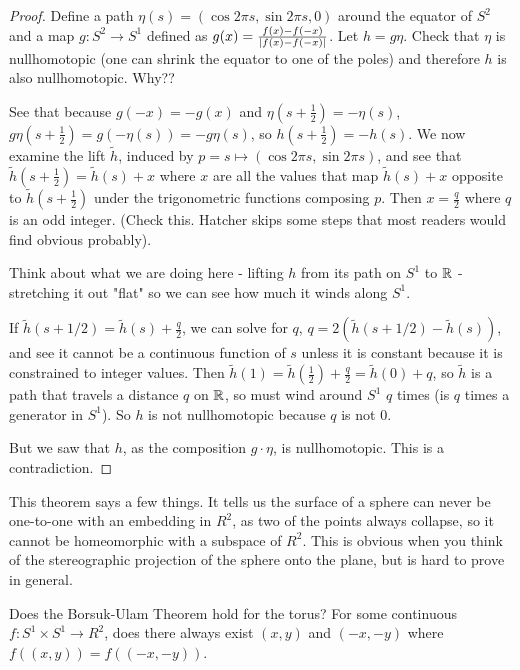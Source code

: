 \documentclass[10pt]{article}
\begin{document}
\begin{proof}

	Define a path $\eta(s) = (\cos 2\pi s, \sin 2\pi s, 0)$ around the equator of
	$S^2$ and a map $g: S^2 \to S^1$ defined as $g(x) = \frac{f(x) -
	f(-x)}{\lvert f(x) - f(-x)\rvert}$. Let $h = g\eta$. Check that $\eta$ is
	nullhomotopic (one can shrink the equator to one of the poles) and therefore
	$h$ is also nullhomotopic. Why??

	See that because $g(-x) = -g(x)$ and $\eta(s + \frac 1 2) = -\eta(s)$,
	$g\eta(s + \frac 1 2) = g(-\eta(s)) = -g\eta(s)$, so $h(s + \frac 1 2) =
	-h(s)$. We now examine the lift $\tilde{h}$, induced by $p = s \mapsto (\cos
	2\pi s, \sin 2\pi s)$, and see that $\tilde{h}(s+\frac 1 2) = \tilde{h}(s) +x$
	where $x$ are all the values that map $\tilde{h}(s) +x$ opposite to
	$\tilde{h}(s+\frac 1 2)$ under the trigonometric functions composing $p$.
	Then $x = \frac q 2$ where $q$ is an odd integer. (Check this. Hatcher skips
	some steps that most readers would find obvious probably).

	Think about what we are doing here - lifting $h$ from its path on $S^1$ to
	$\mathbb{R}$ - stretching it out "flat" so we can see how much it winds along $S^1$.

	If $\tilde{h}(s + 1/2) = \tilde{h}(s) + \frac q 2$, we can solve for $q$, $q
	= 2(\tilde{h}(s + 1/2) - \tilde{h}(s))$, and see it cannot be a continuous
	function of $s$ unless it is constant because it is constrained to integer
	values. Then $\tilde{h}(1) = \tilde{h}(\frac 1 2) + \frac q 2 = \tilde{h}(0)
	+ q$, so $\tilde{h}$ is a path that travels a distance $q$ on $\mathbb{R}$, so must wind
	around $S^1$ $q$ times (is $q$ times a generator in $S^1$). So $h$ is not
	nullhomotopic because $q$ is not 0.

	But we saw that $h$, as the composition $g \cdot \eta$, is nullhomotopic.
	This is a contradiction.

\end{proof}


This theorem says a few things. It tells us the surface of a sphere can never
be one-to-one with an embedding in $R^2$, as two of the points always collapse,
so it cannot be homeomorphic with a subspace of $R^2$. This is obvious when you
think of the stereographic projection of the sphere onto the plane, but is hard
to prove in general.

\begin{exercise}[8]
	Does the Borsuk-Ulam Theorem hold for the torus? For some continuous $f: S^1
	\times S^1 \to R^2$, does there always exist $(x, y)$ and $(-x, -y)$ where $f((x, y)) = f((-x, -y))$.
\end{exercise}
\end{document}
